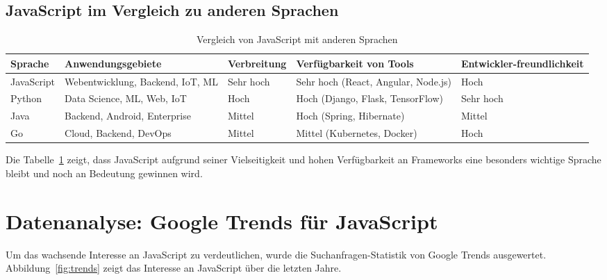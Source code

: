 \documentclass[a4paper,12pt]{article}
\begin{document}
\subsection{JavaScript im Vergleich zu anderen Sprachen}

\begin{table}[h]
    \centering
    \begin{tabular}{p{2.5cm} p{3.5cm} p{2.5cm} p{4cm} p{2.5cm}}
        \toprule
        \textbf{Sprache} & \textbf{Anwendungsgebiete} & \textbf{Verbreitung} & \textbf{Verfügbarkeit von Tools} & \textbf{Entwickler-freundlichkeit} \\
        \midrule
        JavaScript & Webentwicklung, \newline Backend, IoT, ML & Sehr hoch & Sehr hoch (React, \newline Angular, Node.js) & Hoch \\
        Python     & Data Science, \newline ML, Web, IoT      & Hoch      & Hoch (Django, \newline Flask, TensorFlow) & Sehr hoch \\
        Java       & Backend, \newline Android, Enterprise    & Mittel    & Hoch (Spring, \newline Hibernate) & Mittel \\
        Go         & Cloud, \newline Backend, DevOps          & Mittel    & Mittel (Kubernetes, \newline Docker) & Hoch \\
        \bottomrule
    \end{tabular}
    \caption{Vergleich von JavaScript mit anderen Sprachen}
    \label{tab:vergleich}
\end{table}


Die Tabelle~\ref{tab:vergleich} zeigt, dass JavaScript aufgrund seiner Vielseitigkeit und hohen Verfügbarkeit an Frameworks eine besonders wichtige Sprache bleibt und noch an Bedeutung gewinnen wird.

\section{Datenanalyse: Google Trends für JavaScript}
Um das wachsende Interesse an JavaScript zu verdeutlichen, wurde die Suchanfragen-Statistik von Google Trends ausgewertet. Abbildung~\ref{fig:trends} zeigt das Interesse an JavaScript über die letzten Jahre.
\end{document}
